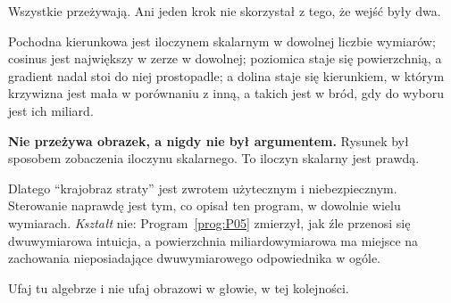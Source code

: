 \begin{fr}
\begin{ansblock}
Wszystkie przeżywają. Ani jeden krok nie skorzystał z tego, że wejść były
dwa.
\end{ansblock}

Pochodna kierunkowa jest iloczynem skalarnym w dowolnej liczbie wymiarów;
cosinus jest największy w zerze w dowolnej; poziomica staje się powierzchnią, a
gradient nadal stoi do niej prostopadle; a dolina staje się kierunkiem, w
którym krzywizna jest mała w porównaniu z inną, a takich jest w bród, gdy do
wyboru jest ich miliard.

\textbf{Nie przeżywa obrazek, a nigdy nie był argumentem.} Rysunek był
sposobem zobaczenia iloczynu skalarnego. To iloczyn skalarny jest prawdą.

\begin{aibox}
Dlatego \enquote{krajobraz straty} jest zwrotem użytecznym i niebezpiecznym.
Sterowanie naprawdę jest tym, co opisał ten program, w dowolnie wielu
wymiarach. \emph{Kształt} nie: Program~\ref{prog:P05} zmierzył, jak źle
przenosi się dwuwymiarowa intuicja, a powierzchnia miliardowymiarowa ma
miejsce na zachowania nieposiadające dwuwymiarowego odpowiednika w ogóle.

Ufaj tu algebrze i nie ufaj obrazowi w głowie, w tej kolejności.
\end{aibox}
\end{fr}

